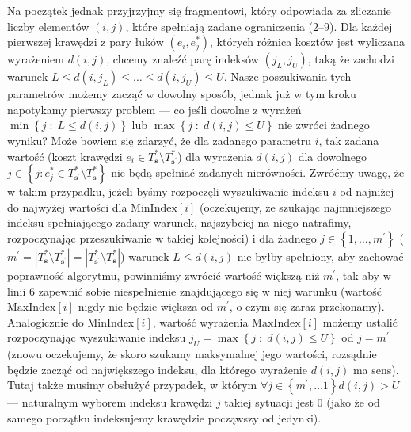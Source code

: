 {Na początek jednak przyjrzyjmy się fragmentowi, który odpowiada za zliczanie liczby elementów $\left( i, j \right)$, które spełniają zadane ograniczenia ($2$--$9$). Dla każdej pierwszej krawędzi z pary łuków $\left( e_{i}, e^{\ast}_{j} \right)$, których różnica kosztów jest wyliczana wyrażeniem $d \left( i, j \right)$, chcemy znaleźć parę indeksów $\left( j_{L}, j_{U} \right)$, taką że zachodzi warunek $L \leqslant d \left( i, j_{L} \right) \leqslant \dots \leqslant d \left( i, j_{U} \right) \leqslant U$. Nasze poszukiwania tych parametrów możemy zacząć w dowolny sposób, jednak już w tym kroku napotykamy pierwszy problem --- co jeśli dowolne z wyrażeń $\min \left\{ j \; : \; L \leqslant d \left( i, j \right) \right\}$ lub $\max \left\{ j \; : \; d \left( i, j \right) \leqslant U \right\}$ nie zwróci żadnego wyniku? Może bowiem się zdarzyć, że dla zadanego parametru $i$, tak zadana wartość (koszt krawędzi $e_{i} \in T^{\ast}_{\textbf{s}} \setminus T^{\ast}_{\textbf{s}^{\prime}}$) dla wyrażenia $d \left( i, j \right)$ dla dowolnego $j \in \left\{ j : e^{\ast}_{j} \in T^{\ast}_{\textbf{s}^{\prime}} \setminus T^{\ast}_{\textbf{s}} \right\}$ nie będą spełniać zadanych nierówności. Zwróćmy uwagę, że w takim przypadku, jeżeli byśmy rozpoczęli wyszukiwanie indeksu $i$ od najniżej do najwyżej wartości dla $\text{MinIndex} \left[ i \right]$ (oczekujemy, że szukając najmniejszego indeksu spełniającego zadany warunek, najszybciej na niego natrafimy, rozpoczynając przeszukiwanie w takiej kolejności) i dla żadnego $j \in \left\{ 1, \dots, m^{\prime} \right\}$ ($m^{\prime} = \left| T^{\ast}_{\textbf{s}} \setminus T^{\ast}_{\textbf{s}^{\prime}} \right| = \left| T^{\ast}_{\textbf{s}^{\prime}} \setminus T^{\ast}_{\textbf{s}} \right|$) warunek $ L \leqslant d \left( i, j \right)$ nie byłby spełniony, aby zachować poprawność algorytmu, powinniśmy zwrócić wartość większą niż $m^{\prime}$, tak aby w linii $6$ zapewnić sobie niespełnienie znajdującego się w niej warunku (wartość $\text{MaxIndex} \left[ i \right]$ nigdy nie będzie większa od $m^{\prime}$, o czym się zaraz przekonamy). Analogicznie do $\text{MinIndex} \left[ i \right]$, wartość wyrażenia $\text{MaxIndex} \left[ i \right]$ możemy ustalić rozpoczynając wyszukiwanie indeksu $j_{U} = \max \left\{ j \; : \; d \left( i, j \right) \leqslant U \right\}$ od $j = m^{\prime}$ (znowu oczekujemy, że skoro szukamy maksymalnej jego wartości, rozsądnie będzie zacząć od największego indeksu, dla którego wyrażenie $d \left( i, j \right)$ ma sens). Tutaj także musimy obsłużyć przypadek, w którym $\forall j \in \left\{ m^{\prime}, \dots 1 \right\} d \left( i, j \right) > U$ --- naturalnym wyborem indeksu krawędzi $j$  takiej sytuacji jest $0$ (jako że od samego początku indeksujemy krawędzie począwszy od jedynki).

}
